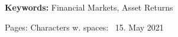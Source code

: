 \begin{titlepage}

\begin{minipage}{1\textwidth}


\vspace{5mm}
\textbf{Keywords:} Financial Markets, Asset Returns
\end{minipage}

\vfill %


Pages: \pageref{LastPage} \qquad Characters w. spaces: \qquad
\makeatletter
\ 15. May 2021
\makeatother


\end{titlepage}